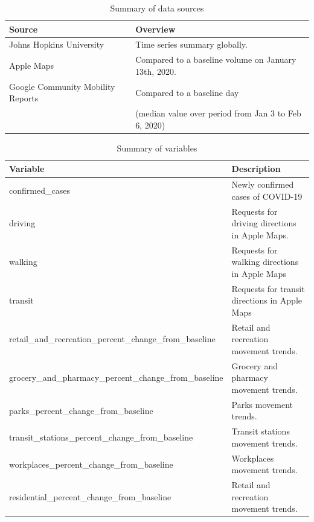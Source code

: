 \documentclass[preprint, 12pt]{elsarticle}
\newcommand{\?}{\stackrel{?}{=}}
\begin{document}
\begin{table}[h!]\small
  \centering
  \caption{Summary of data sources}
  \label{tab:sources}
\begin{tabular}{ll}\toprule
\bf Source                         & \bf Overview                                                                              \\\midrule
Johns Hopkins University          & Time series summary globally.                                                               \\
Apple Maps                        & Compared to a baseline volume on January 13th, 2020.                                          \\
  Google Community Mobility Reports & Compared to a baseline day \\
  & (median value over period from Jan 3 to Feb 6, 2020)\\\bottomrule
\end{tabular}
\end{table}

\begin{table}[h!]
  \centering
\caption{Summary of variables}
\label{tab:variables}
\small
\begin{tabular}{ll}\toprule
\textbf{Variable}                                         & \textbf{Description}                                    \\\midrule
confirmed\_cases                                         & Newly confirmed cases of COVID-19              \\
driving                                                  & Requests for driving directions in Apple Maps.    \\
walking                                                  & Requests for walking directions in Apple Maps   \\
transit                                                  & Requests for transit directions in Apple Maps   \\
retail\_and\_recreation\_percent\_change\_from\_baseline & Retail and recreation movement trends.            \\
grocery\_and\_pharmacy\_percent\_change\_from\_baseline  & Grocery and pharmacy movement trends.             \\
parks\_percent\_change\_from\_baseline                   & Parks movement trends.                           \\
transit\_stations\_percent\_change\_from\_baseline       & Transit stations movement trends.                \\
workplaces\_percent\_change\_from\_baseline              & Workplaces movement trends.                      \\
residential\_percent\_change\_from\_baseline             & Retail and recreation movement trends.          \\\bottomrule
\end{tabular}
\end{table}
\end{document}
